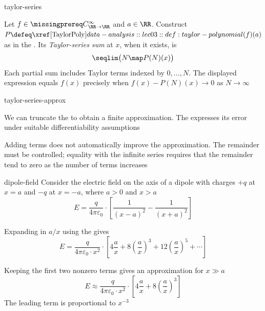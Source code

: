 \documentclass[12pt]{article}
\numberwithin{figure}{section}
\begin{document}
\begin{dfn}{taylor-series}
  \leavevmode\par
  \begingroup\color{notesmissingprereq}
  \par\smallskip
  Let $f\in\SmoothRealFunctions$ and $a\in\RR$.
  Construct $P\defeq\TaylorPoly(f)(a)$ as in the
  .
  Its \emph{Taylor-series sum} at $x$, when it exists, is
  \[
    \seqlim\bigl(N\map P(N)(x)\bigr)
  \]
  Each partial sum includes Taylor terms indexed by $0,\ldots,N$.
  The displayed expression equals $f(x)$ precisely when
  $f(x)-P(N)(x)\to0$ as $N\to\infty$
  \par\endgroup
\end{dfn}

\begin{rem}{taylor-series-approx}
  \leavevmode\par
  \begingroup\color{notesmissingprereq}
  \par\smallskip
  We can truncate the  to obtain a
  finite approximation. The
  expresses its error under suitable differentiability assumptions

  Adding terms does not automatically improve the approximation. The
  remainder must be controlled; equality with the infinite series requires
  that the remainder tend to zero as the number of terms increases
  \par\endgroup
\end{rem}

\begin{eg}{dipole-field}
  Consider the electric field on the axis of a dipole with charges $+q$ at
  $x=a$ and $-q$ at $x=-a$, where $a>0$ and $x>a$
  \[
    E=\frac{q}{4\pi\varepsilon_0}\cdot\left[
      \frac{1}{(x-a)^2}-\frac{1}{(x+a)^2}
    \right]
  \]

  Expanding in $a/x$ using the  gives
  \[
    E=\frac{q}{4\pi\varepsilon_0\cdot x^2}\cdot\left[
      4\frac{a}{x}+8\left(\frac{a}{x}\right)^3
      +12\left(\frac{a}{x}\right)^5+\cdots
    \right]
  \]

  Keeping the first two nonzero terms gives an approximation for $x\gg a$
  \[
    E\approx\frac{q}{4\pi\varepsilon_0\cdot x^2}\cdot\left[
      4\frac{a}{x}+8\left(\frac{a}{x}\right)^3
    \right]
  \]
  The leading term is proportional to $x^{-3}$
\end{eg}
\end{document}
